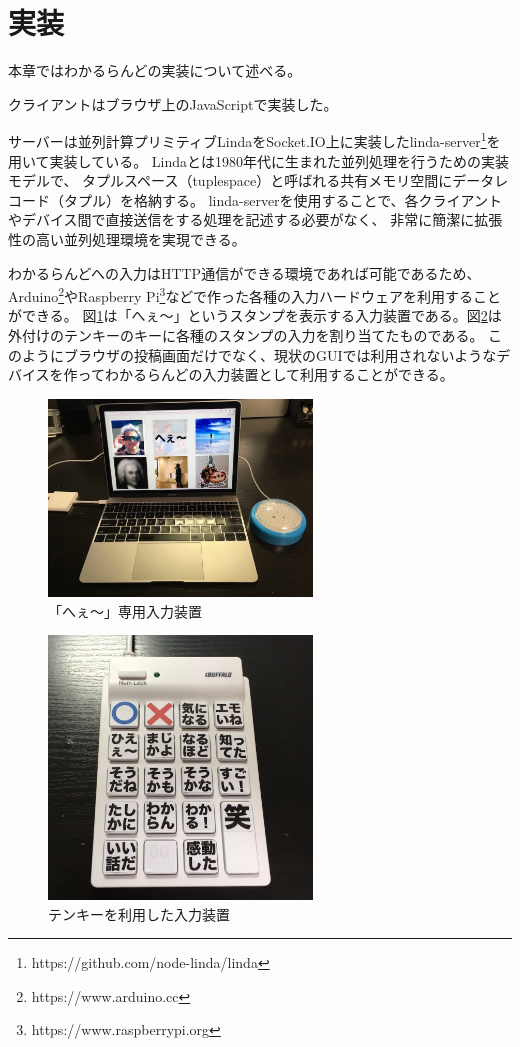 \section{実装}

本章ではわかるらんどの実装について述べる。

クライアントはブラウザ上のJavaScriptで実装した。

サーバーは並列計算プリミティブLindaをSocket.IO上に実装したlinda-server\footnote{https://github.com/node-linda/linda}を用いて実装している。
Lindaとは1980年代に生まれた並列処理を行うための実装モデルで、
タプルスペース（tuplespace）と呼ばれる共有メモリ空間にデータレコード（タプル）を格納する。
linda-serverを使用することで、各クライアントやデバイス間で直接送信をする処理を記述する必要がなく、
非常に簡潔に拡張性の高い並列処理環境を実現できる。

わかるらんどへの入力はHTTP通信ができる環境であれば可能であるため、Arduino\footnote{https://www.arduino.cc}やRaspberry Pi\footnote{https://www.raspberrypi.org}などで作った各種の入力ハードウェアを利用することができる。
図\ref{button}は「へぇ〜」というスタンプを表示する入力装置である。図\ref{10key}は外付けのテンキーのキーに各種のスタンプの入力を割り当てたものである。
このようにブラウザの投稿画面だけでなく、現状のGUIでは利用されないようなデバイスを作ってわかるらんどの入力装置として利用することができる。

\begin{figure}[h]
\centering
\includegraphics[width=7cm]{images/button.eps}
\caption{「へぇ〜」専用入力装置}
\label{button}
\end{figure}

\begin{figure}[h]
\centering
\includegraphics[width=7cm]{images/10key.eps}
\caption{テンキーを利用した入力装置}
\label{10key}
\end{figure}